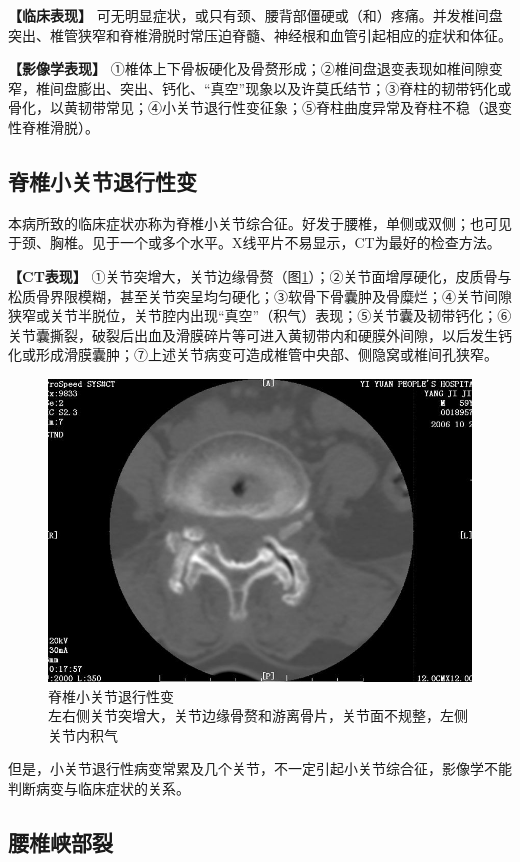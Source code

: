 \textbf{【临床表现】}
可无明显症状，或只有颈、腰背部僵硬或（和）疼痛。并发椎间盘突出、椎管狭窄和脊椎滑脱时常压迫脊髓、神经根和血管引起相应的症状和体征。

\textbf{【影像学表现】}
①椎体上下骨板硬化及骨赘形成；②椎间盘退变表现如椎间隙变窄，椎间盘膨出、突出、钙化、“真空”现象以及许莫氏结节；③脊柱的韧带钙化或骨化，以黄韧带常见；④小关节退行性变征象；⑤脊柱曲度异常及脊柱不稳（退变性脊椎滑脱）。

\subsection{脊椎小关节退行性变}

本病所致的临床症状亦称为脊椎小关节综合征。好发于腰椎，单侧或双侧；也可见于颈、胸椎。见于一个或多个水平。X线平片不易显示，CT为最好的检查方法。

\textbf{【CT表现】}
①关节突增大，关节边缘骨赘（图\ref{fig23-10}）；②关节面增厚硬化，皮质骨与松质骨界限模糊，甚至关节突呈均匀硬化；③软骨下骨囊肿及骨糜烂；④关节间隙狭窄或关节半脱位，关节腔内出现“真空”（积气）表现；⑤关节囊及韧带钙化；⑥关节囊撕裂，破裂后出血及滑膜碎片等可进入黄韧带内和硬膜外间隙，以后发生钙化或形成滑膜囊肿；⑦上述关节病变可造成椎管中央部、侧隐窝或椎间孔狭窄。

\begin{figure}[!htbp]
 \centering
 \includegraphics[width=.7\textwidth,height=\textheight,keepaspectratio]{./images/Image00473.jpg}
 \captionsetup{justification=centering}
 \caption{脊椎小关节退行性变\\{\small 左右侧关节突增大，关节边缘骨赘和游离骨片，关节面不规整，左侧关节内积气}}
 \label{fig23-10}
  \end{figure} 

但是，小关节退行性病变常累及几个关节，不一定引起小关节综合征，影像学不能判断病变与临床症状的关系。

\subsection{腰椎峡部裂}

